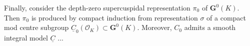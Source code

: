 \documentclass[10pt]{amsart}
\theoremstyle{plain}
\theoremstyle{definition}
\newcommand{\OK}{\mathcal{O}_K}
\newcommand{\G}{\textbf{G}}
\begin{document}
Finally, consider the depth-zero supercuspidal representation $\pi_0$ of $\G^0(K)$.
Then $\pi_0$ is produced by compact induction from representation $\sigma$ of a compact mod centre subgroup $\underline{C}_0(\OK) \subset \G^0(K)$. Moreover, $C_0$ admits a smooth integral model $\underline{C}$ ...


\fi


\end{document}
